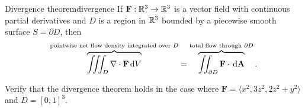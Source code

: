 \documentclass[svgnames]{watsonbook}
\begin{document}
\begin{theo}{Divergence theorem}{divergence}
  If $\mathbf{F} : \mathbb{R}^3 \to \mathbb{R}^3$ is a vector field with continuous
  partial derivatives and $D$ is a region in $\mathbb{R}^3$ bounded by a
  piecewise smooth surface $S = \partial D$, then 
  \[
    \overbrace{\iiint_D \nabla \cdot \mathbf{F} \,
      \mathrm{d} V}^{\text{pointwise net flow density
        integrated over $D$}} = \overbrace{\iint_{\partial D}
    \mathbf{F} \cdot \, {\mathrm{d}}\mathbf{A}}^{\text{total flow through
      $\partial D$}}. 
  \]
\end{theo}

\begin{example}{}{}
  Verify that the divergence theorem holds in the case where
  $\mathbf{F} = \langle x^2, 3z^2, 2z^2 + y^2 \rangle$ and $D = [0,1]^3$. 
\end{example}
\end{document}
